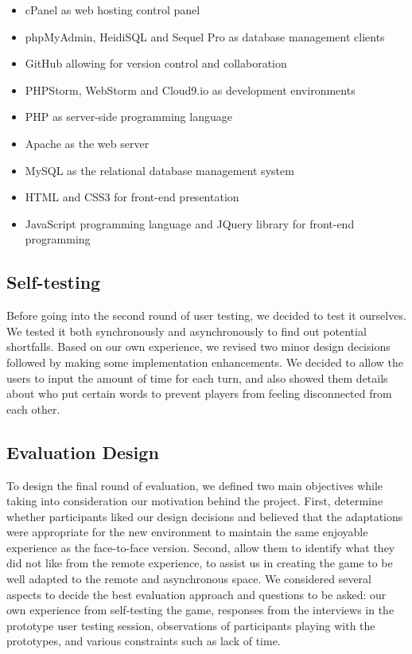 \documentclass{sigchi}
\begin{document}
\begin{itemize}[leftmargin=.3in,nosep]
\item cPanel as web hosting control panel
\item phpMyAdmin, HeidiSQL and Sequel Pro as database management clients
\item GitHub allowing for version control and collaboration
\item PHPStorm, WebStorm and Cloud9.io as development environments
\item PHP as server-side programming language
\item Apache as the web server
\item MySQL as the relational database management system
\item HTML and CSS3 for front-end presentation
\item JavaScript programming language and JQuery library for front-end programming
\end{itemize}

\subsection{Self-testing}
Before going into the second round of user testing, we decided to test it ourselves. We tested it both synchronously and asynchronously to find out potential shortfalls. Based on our own experience, we revised two minor design decisions followed by making some implementation enhancements. We decided to allow the users to input the amount of time for each turn, and also showed them details about who put certain words to prevent players from feeling disconnected from each other.

\subsection{Evaluation Design}
To design the final round of evaluation, we defined two main objectives while taking into consideration our motivation behind the project. First, determine whether participants liked our design decisions and believed that the adaptations were appropriate for the new environment to maintain the same enjoyable experience as the face-to-face version. Second, allow them to identify what they did not like from the remote experience, to assist us in creating the game to be well adapted to the remote and asynchronous space. We considered several aspects to decide the best evaluation approach and questions to be asked: our own experience from self-testing the game, responses from the interviews in the prototype user testing session, observations of participants playing with the prototypes, and various constraints such as lack of time. 
\end{document}
